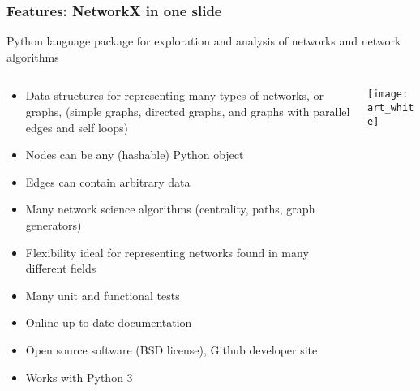 \begin{frame}
\frametitle{Features: NetworkX in one slide}
Python language package for exploration and analysis of
networks and network algorithms

\begin{columns}[c]
\begin{column}{0.65\textwidth}
\begin{itemize}

\item Data structures for representing many types of networks, or graphs,
(simple graphs, directed graphs, and graphs with parallel edges and
  self loops)
\item Nodes can be any (hashable) Python object
\item Edges can contain arbitrary data
\item Many network science algorithms (centrality, paths, graph generators)
\item Flexibility ideal for representing networks found
in many different fields
\item Many unit and functional tests
\item Online up-to-date documentation
\item Open source software (BSD license), Github developer site
\item Works with Python 3
\end{itemize}
\end{column}
\begin{column}{0.35\textwidth}
\centerline{\texttt{[image: art\_white]}}
\end{column}
\end{columns}
\end{frame}


